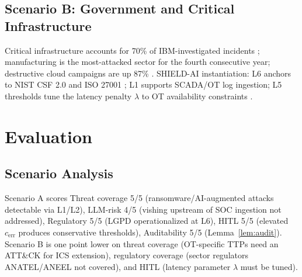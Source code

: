\documentclass[journal]{IEEEtran}
\begin{document}
\subsection{Scenario B: Government and Critical Infrastructure}
Critical infrastructure accounts for 70\% of IBM-investigated incidents \cite{xforce2025};
manufacturing is the most-attacked sector for the fourth consecutive year; destructive cloud
campaigns are up 87\% \cite{mddr2025}. SHIELD-AI instantiation: L6 anchors to NIST CSF 2.0
\cite{nist2024csf} and ISO 27001 \cite{iso27001}; L1 supports SCADA/OT log ingestion; L5
thresholds tune the latency penalty $\lambda$ to OT availability constraints
\cite{nsa2024deploying}.

\section{Evaluation}
\label{sec:eval}

\subsection{Scenario Analysis}

\begin{table}[!t]
\renewcommand{\arraystretch}{1.2}
\caption{Scenario evaluation (author-assigned Likert 1--5; protocol pre-registered).}
\label{tab:scenarioscores}
\centering
\scriptsize
{}%
\end{table}

Scenario A scores Threat coverage 5/5 (ransomware/AI-augmented attacks detectable via L1/L2),
LLM-risk 4/5 (vishing upstream of SOC ingestion not addressed), Regulatory 5/5 (LGPD
operationalized at L6), HITL 5/5 (elevated $c_{\text{err}}$ produces conservative thresholds),
Auditability 5/5 (Lemma~\ref{lem:audit}). Scenario B is one point lower on threat coverage
(OT-specific TTPs need an ATT\&CK for ICS extension), regulatory coverage (sector regulators
ANATEL/ANEEL not covered), and HITL (latency parameter $\lambda$ must be tuned).
\end{document}
